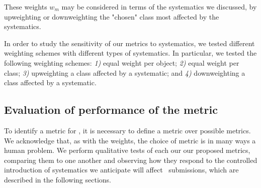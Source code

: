 These weights $w_{m}$ may be considered in terms of the systematics we discussed, by upweighting or downweighting the "chosen" class most affected by the systematics.

In order to study the sensitivity of our metrics to systematics, we tested different weighting schemes with different types of systematics. In particular, we tested the following weighting schemes: \emph{1)} equal weight per object; \emph{2)} equal weight per class; \emph{3)} upweighting a class affected by a systematic; and \emph{4)} downweighting a class affected by a systematic.



\subsection{Evaluation of performance of the metric}
\label{sec:inception}

To identify a metric for \plasticc, it is necessary to define a metric over possible metrics.
We acknowledge that, as with the weights, the choice of metric is in many ways a human problem.
We perform qualitative tests of each our our proposed metrics, comparing them to one another and observing how they respond to the controlled introduction of systematics we anticipate will affect \plasticc\ submissions, which are described in the following sections.
